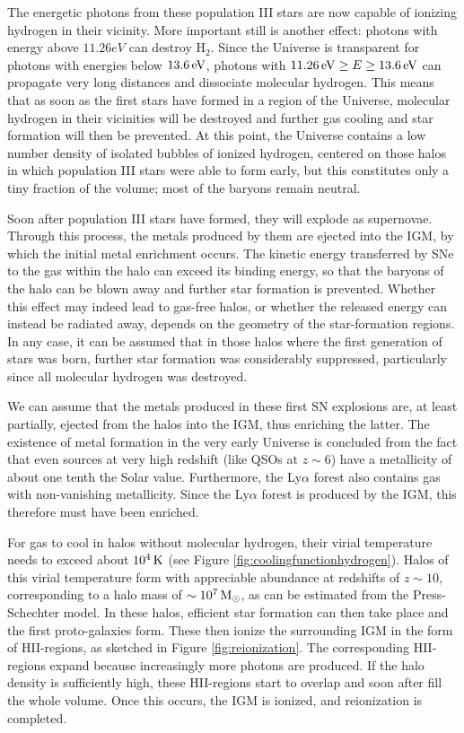 \documentclass[a4paper,11pt]{article}
\begin{document}
{\noindent}The energetic photons from these population III stars are now capable of ionizing hydrogen in their vicinity. More important still is another effect: photons with energy above $11.26eV$ can destroy H$_2$. Since the Universe is transparent for photons with energies below $13.6\,{\rm eV}$, photons with $11.26\,{\rm eV}\geq E \geq 13.6\,{\rm eV}$ can propagate very long distances and dissociate molecular hydrogen. This means that as soon as the first stars have formed in a region of the Universe, molecular hydrogen in their vicinities will be destroyed and further gas cooling and star formation will then be prevented. At this point, the Universe contains a low number density of isolated bubbles of ionized hydrogen, centered on those halos in which population III stars were able to form early, but this constitutes only a tiny fraction of the volume; most of the baryons remain neutral.

{\noindent}Soon after population III stars have formed, they will explode as supernovae. Through this process, the metals produced by them are ejected into the IGM, by which the initial metal enrichment occurs. The kinetic energy transferred by SNe to the gas within the halo can exceed its binding energy, so that the baryons of the halo can be blown away and further star formation is prevented. Whether this effect may indeed lead to gas-free halos, or whether the released energy can instead be radiated away, depends on the geometry of the star-formation regions. In any case, it can be assumed that in those halos where the first generation of stars was born, further star formation was considerably suppressed, particularly since all molecular hydrogen was destroyed.

{\noindent}We can assume that the metals produced in these first SN explosions are, at least partially, ejected from the halos into the IGM, thus enriching the latter. The existence of metal formation in the very early Universe is concluded from the fact that even sources at very high redshift (like QSOs at $z\sim6$) have a metallicity of about one tenth the Solar value. Furthermore, the Ly$\alpha$ forest also contains gas with non-vanishing metallicity. Since the Ly$\alpha$ forest is produced by the IGM, this therefore must have been enriched.

{\noindent}For gas to cool in halos without molecular hydrogen, their virial temperature needs to exceed about $10^4\,{\rm K}$ (see Figure \ref{fig:coolingfunctionhydrogen}). Halos of this virial temperature form with appreciable abundance at redshifts of $z\sim10$, corresponding to a halo mass of $\sim10^7\,{\rm M_\odot}$, as can be estimated from the Press-Schechter model. In these halos, efficient star formation can then take place and the first proto-galaxies form. These then ionize the surrounding IGM in the form of HII-regions, as sketched in Figure \ref{fig:reionization}. The corresponding HII-regions expand because increasingly more photons are produced. If the halo density is sufficiently high, these HII-regions start to overlap and soon after fill the whole volume. Once this occurs, the IGM is ionized, and reionization is completed.
\end{document}
